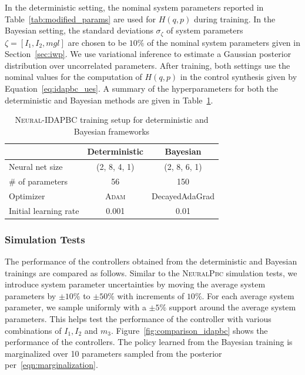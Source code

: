 In the deterministic setting, the nominal system parameters reported in
Table~\ref{tab:modified_params} are used for $H(q,p)$ during training. 
%
In the Bayesian setting, the standard deviations $\sigma_{\zeta}$ of system
parameters $\zeta = [I_1, I_2, mgl]$ are chosen to be $10\%$ of the nominal system
parameters given in Section~\ref{sec:iwp}.
%
We use variational inference to estimate a Gaussian posterior distribution
over uncorrelated parameters.
%
After training, both settings use the nominal values for the computation of
$H(q,p)$ in the control synthesis given by Equation~\eqref{eq:idapbc_ues}.
%
A summary of the hyperparameters for both the deterministic and Bayesian methods
are given in Table~\ref{tab:training_setup_idapbc}. 
\begin{table}[t]
    \centering
    \caption{\textsc{Neural-IDAPBC} training setup for deterministic and Bayesian frameworks}
    \begin{tabular}{lcc}
    \toprule
    & Deterministic & Bayesian \\
    \midrule
        Neural net size & (2, 8, 4, 1) & (2, 8, 6, 1)\\
        \# of parameters &  56  & 150\\
        Optimizer & \textsc{Adam} & DecayedAdaGrad\\
        Initial learning rate & 0.001 & 0.01\\
    \bottomrule
    \end{tabular}
    \label{tab:training_setup_idapbc}
\end{table}

\subsubsection{Simulation Tests} 
The performance of the controllers obtained from the deterministic and Bayesian
trainings are compared as follows.
%
%
Similar to the \textsc{NeuralPbc} simulation tests, we introduce system
parameter uncertainties by moving the average system parameters by $\pm
10\%$ to $\pm 50\%$ with increments of $10\%$. 
%
For each average system parameter, we sample uniformly with a $\pm 5\%$ support
around the average system parameters. 
%
This helps test the performance of the controller with various combinations of
$I_1, I_2$ and $m_3$.
%
%
%
Figure~\ref{fig:comparison_idapbc} shows the performance of the controllers.
The policy learned from the Bayesian training is marginalized over 10
parameters sampled from the posterior per~\eqref{eqn:marginalization}.

